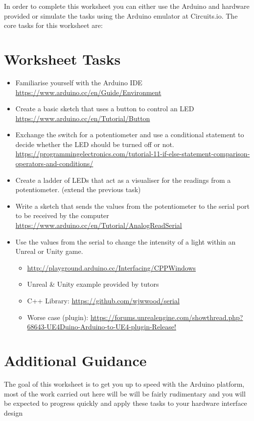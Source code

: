\documentclass{../../../fal_assignment}
\begin{document}
In order to complete this worksheet you can either use the Arduino and hardware provided or simulate the tasks using the Arduino emulator at Circuits.io. The core tasks for this worksheet are:

\section*{Worksheet Tasks}
\begin{itemize}
	\item Familiarise yourself with the Arduino IDE \url{https://www.arduino.cc/en/Guide/Environment}
	\item Create a basic sketch that uses a button to control an LED \url{https://www.arduino.cc/en/Tutorial/Button}
	\item Exchange the switch for a potentiometer and use a conditional statement to decide whether the LED should be turned off or not. \url{https://programmingelectronics.com/tutorial-11-if-else-statement-comparison-operators-and-conditions/}
	\item Create a ladder of LEDs that act as a visualiser for the readings from a potentiometer. (extend the previous task)
	\item Write a sketch that sends the values from the potentiometer to the serial port to be received by the computer \url{https://www.arduino.cc/en/Tutorial/AnalogReadSerial}
	\item Use the values from the serial to change the intensity of a light within an Unreal or Unity game. 
		\begin{itemize}
			\item \url{http://playground.arduino.cc/Interfacing/CPPWindows} 
			\item Unreal \& Unity example provided by tutors
			\item C++ Library: \url{https://github.com/wjwwood/serial}
			\item Worse case (plugin): \url{https://forums.unrealengine.com/showthread.php?68643-UE4Duino-Arduino-to-UE4-plugin-Release!}
		\end{itemize}
\end{itemize}


\section*{Additional Guidance}

The goal of this worksheet is to get you up to speed with the Arduino platform, most of the work carried out here will be will be fairly rudimentary and you will be expected to progress quickly and apply these tasks to your hardware interface design
\end{document}
